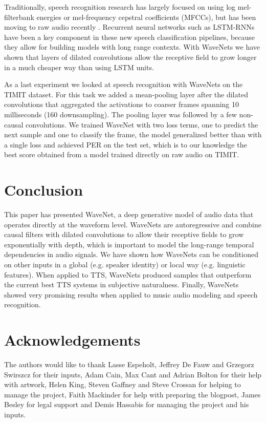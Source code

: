 \documentclass{article}
\makeatletter
\newcommand*{\eg}{e.g.\@\xspace}
\makeatother
\begin{document}
Traditionally, speech recognition research has largely focused on using log mel-filterbank energies or mel-frequency cepstral coefficients (MFCCs), but has been moving to raw audio recently \citep{palaz2013estimating,tuske2014acoustic,hoshen2015speech,sainath2015learning}. Recurrent neural networks such as LSTM-RNNs \citep{LSTM} have been a key component in these new speech classification pipelines, because they allow for building models with long range contexts. With WaveNets we have shown that layers of dilated convolutions allow the receptive field to grow longer in a much cheaper way than using LSTM units.

As a last experiment we looked at speech recognition with WaveNets on the TIMIT \citep{TIMIT} dataset. For this task we added a mean-pooling layer after the dilated convolutions that aggregated the activations to coarser frames spanning 10 milliseconds (160 downsampling). The pooling layer was followed by a few non-causal convolutions. We trained WaveNet with two loss terms, one to predict the next sample and one to classify the frame, the model generalized better than with a single loss and achieved  PER on the test set, which is to our knowledge the best score obtained from a model trained directly on raw audio on TIMIT.
 
\section{Conclusion}
This paper has presented WaveNet, a deep generative model of audio data that operates directly at the waveform level. WaveNets are autoregressive and combine causal filters with dilated convolutions to allow their receptive fields to grow exponentially with depth, which is important to model the long-range temporal dependencies in audio signals. We have shown how WaveNets can be conditioned on other inputs in a global (\eg speaker identity) or local way (\eg linguistic features). When applied to TTS, WaveNets produced samples that outperform the current best TTS systems in subjective naturalness. Finally, WaveNets showed very promising results when applied to music audio modeling and speech recognition.
 
\section*{Acknowledgements} 
The authors would like to thank Lasse Espeholt, Jeffrey De Fauw and Grzegorz Swirszcz for their inputs, Adam Cain, Max Cant and Adrian Bolton for their help with artwork, Helen King, Steven Gaffney and Steve Crossan for helping to manage the project, Faith Mackinder for help  with preparing the blogpost, James Besley for legal support and Demis Hassabis for managing the project and his inputs.


\end{document}
